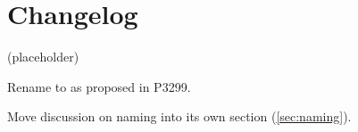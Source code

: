 \section{Changelog}
(placeholder)
\begin{revision}
\item Rename  to  as proposed in P3299.
\item Move discussion on naming into its own section (\ref{sec:naming}).
\end{revision}
